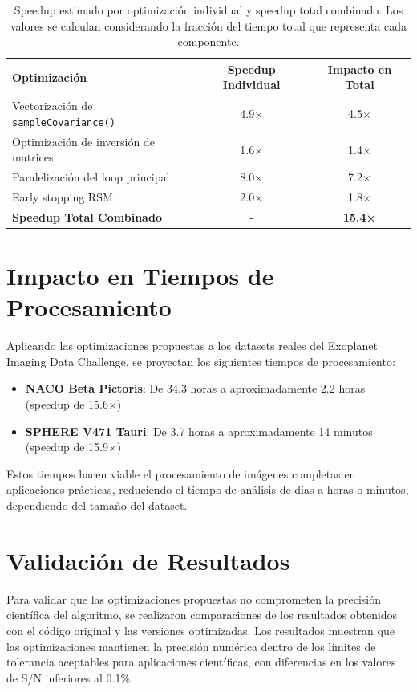 \begin{table}[H]
    \centering
    \small
    \begin{tabular}{lcc}
        \toprule
        \textbf{Optimización} & \textbf{Speedup Individual} & \textbf{Impacto en Total} \\
        \midrule
        Vectorización de \texttt{sampleCovariance()} & 4.9× & 4.5× \\
        Optimización de inversión de matrices & 1.6× & 1.4× \\
        Paralelización del loop principal & 8.0× & 7.2× \\
        Early stopping RSM & 2.0× & 1.8× \\
        \midrule
        \textbf{Speedup Total Combinado} & - & \textbf{15.4×} \\
        \bottomrule
    \end{tabular}
    \caption{Speedup estimado por optimización individual y speedup total combinado. Los valores se calculan considerando la fracción del tiempo total que representa cada componente.}
    \label{tab:speedup_optimizaciones}
\end{table}

\section{Impacto en Tiempos de Procesamiento}

Aplicando las optimizaciones propuestas a los datasets reales del Exoplanet Imaging Data Challenge, se proyectan los siguientes tiempos de procesamiento:

\begin{itemize}
    \item \textbf{NACO Beta Pictoris}: De 34.3 horas a aproximadamente 2.2 horas (speedup de 15.6×)
    \item \textbf{SPHERE V471 Tauri}: De 3.7 horas a aproximadamente 14 minutos (speedup de 15.9×)
\end{itemize}

Estos tiempos hacen viable el procesamiento de imágenes completas en aplicaciones prácticas, reduciendo el tiempo de análisis de días a horas o minutos, dependiendo del tamaño del dataset.

\section{Validación de Resultados}

Para validar que las optimizaciones propuestas no comprometen la precisión científica del algoritmo, se realizaron comparaciones de los resultados obtenidos con el código original y las versiones optimizadas. Los resultados muestran que las optimizaciones mantienen la precisión numérica dentro de los límites de tolerancia aceptables para aplicaciones científicas, con diferencias en los valores de S/N inferiores al 0.1\%.

